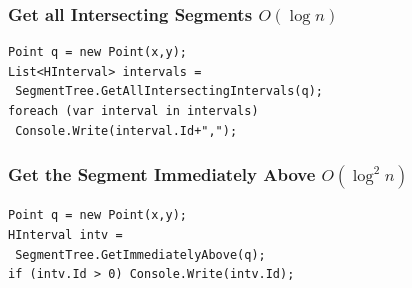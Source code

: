 \documentclass{article}
\begin{document}
\subsubsection{Get all Intersecting Segments $O(\log n)$}
\begin{lstlisting}
Point q = new Point(x,y);
List<HInterval> intervals =
 SegmentTree.GetAllIntersectingIntervals(q);
foreach (var interval in intervals) 
 Console.Write(interval.Id+",");
\end{lstlisting}

\subsubsection{Get the Segment Immediately Above $O(\log^2 n)$}
\begin{lstlisting}
Point q = new Point(x,y);
HInterval intv = 
 SegmentTree.GetImmediatelyAbove(q);
if (intv.Id > 0) Console.Write(intv.Id);
\end{lstlisting}
\end{document}

